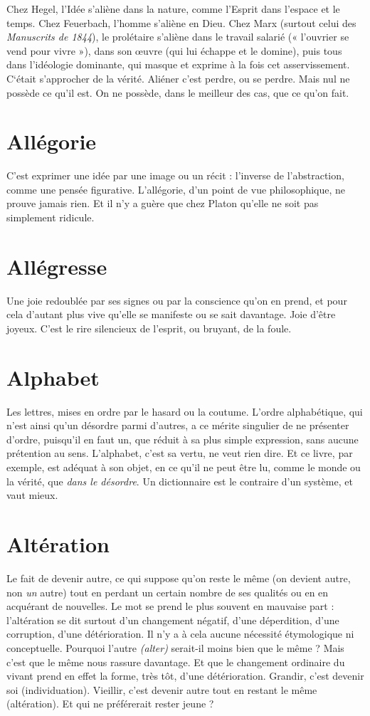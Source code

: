 Chez Hegel, l’Idée s’aliène dans la nature, comme l'Esprit dans l’espace et
le temps. Chez Feuerbach, l’homme s’aliène en Dieu. Chez Marx (surtout celui
des {\it Manuscrits de 1844}), le prolétaire s’aliène dans le travail salarié (« l’ouvrier
se vend pour vivre »), dans son œuvre (qui lui échappe et le domine), puis tous
dans l’idéologie dominante, qui masque et exprime à la fois cet asservissement.
C‘était s'approcher de la vérité. Aliéner c’est perdre, ou se perdre. Mais nul ne
possède ce qu’il est. On ne possède, dans le meilleur des cas, que ce qu’on fait.

\section{Allégorie}
C'est exprimer une idée par une image ou un récit : l’inverse de
l’abstraction, comme une pensée figurative. L’allégorie, d’un
point de vue philosophique, ne prouve jamais rien. Et il n’y a guère que chez
Platon qu’elle ne soit pas simplement ridicule.

\section{Allégresse}
Une joie redoublée par ses signes ou par la conscience qu’on
en prend, et pour cela d’autant plus vive qu’elle se manifeste
ou se sait davantage. Joie d’être joyeux. C’est le rire silencieux de l'esprit, ou
bruyant, de la foule.

\section{Alphabet}
Les lettres, mises en ordre par le hasard ou la coutume. L’ordre
alphabétique, qui n’est ainsi qu’un désordre parmi d’autres, a ce
mérite singulier de ne présenter d'ordre, puisqu'il en faut un, que réduit à sa
plus simple expression, sans aucune prétention au sens. L’alphabet, c’est sa
vertu, ne veut rien dire. Et ce livre, par exemple, est adéquat à son objet, en ce
qu’il ne peut être lu, comme le monde ou la vérité, que {\it dans le désordre}. Un dictionnaire
est le contraire d’un système, et vaut mieux.

\section{Altération}
Le fait de devenir autre, ce qui suppose qu’on reste le même
(on devient autre, non {\it un} autre) tout en perdant un certain
nombre de ses qualités ou en en acquérant de nouvelles. Le mot se prend le
plus souvent en mauvaise part : l’altération se dit surtout d’un changement
négatif, d’une déperdition, d’une corruption, d’une détérioration. Il n’y a à
cela aucune nécessité étymologique ni conceptuelle. Pourquoi l’autre {\it (alter)}
serait-il moins bien que le même ? Mais c’est que le même nous rassure davantage.
Et que le changement ordinaire du vivant prend en effet la forme, très tôt,
d’une détérioration. Grandir, c’est devenir soi (individuation). Vieillir, c’est
devenir autre tout en restant le même (altération). Et qui ne préférerait rester
jeune ?

